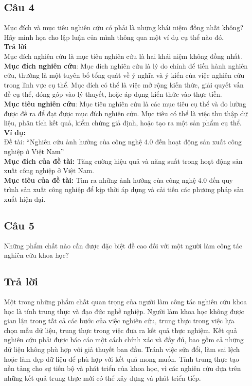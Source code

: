 \subsection*{Câu 4} Mục đích và mục tiêu nghiên cứu có phải là những khái niệm
đồng nhất không? Hãy minh họa cho lập luận của mình thông qua một ví
dụ cụ thể nào đó.\\
{\bf Trả lời}\\
Mục đích nghiên cứu là mục tiêu nghiên cứu là hai khái niệm không đồng nhất.\\
{\bf Mục đích nghiên cứu}: Mục đích nghiên cứu là lý do chính để tiến hành nghiên cứu, thường là một tuyên bố tổng quát về ý nghĩa và ý kiến của việc nghiên cứu trong lĩnh vực cụ thể. Mục đích có thể là việc mở rộng kiến thức, giải quyết vấn đề cụ thể, đóng góp vào lý thuyết, hoặc áp dụng kiến thức vào thực tiễn.\\
{\bf Mục tiêu nghiên cứu}: Mục tiêu nghiên cứu là các mục tiêu cụ thể và đo lường được đề ra để đạt được mục đích nghiên cứu. Mục tiêu có thể là việc thu thập dữ liệu, phân tích kết quả, kiểm chứng giả định, hoặc tạo ra một sản phẩm cụ thể.\\
{\bf Ví dụ:}\\
Đề tài: “Nghiên cứu ảnh hưởng của công nghệ 4.0 đến hoạt động sản xuất công nghiệp ở Việt Nam”\\
{\bf Mục đích của đề tài:} Tăng cường hiệu quả và năng suất trong hoạt động sản xuất công nghiệp ở Việt Nam.\\
{\bf Mục tiêu của đề tài:} Tìm ra những ảnh hưởng của công nghệ 4.0 đến quy trình sản xuất công nghiệp để kịp thời áp dụng và cải tiến các phương pháp sản xuất hiện đại.
\subsection*{Câu 5} Những phẩm chất nào cần được đặc biệt đề cao đối với một người làm công tác nghiên cứu khoa học?
\subsection*{Trả lời}
Một trong những phẩm chất quan trọng của người làm công tác nghiên cứu khoa học là tính trung thực và đạo đức nghề nghiệp.
Người làm khoa học không được gian lận trong tất cả các bước của việc nghiên cứu,
trung thực trong việc lựa chọn mẫu dữ liệu,
trung thực trong việc đưa ra kết quả thực nghiệm.
Kết quả nghiên cứu phải được báo cáo một cách chính xác và đầy đủ, bao gồm cả những dữ liệu không phù hợp với giả thuyết ban đầu.
Tránh việc sửa đổi, làm sai lệch hoặc làm đẹp dữ liệu để phù hợp với kết quả mong muốn. Tính trung thực tạo nền tảng cho sự tiến bộ và phát triển của khoa học, vì các nghiên cứu dựa trên những kết quả trung thực mới có thể xây dựng và phát triển tiếp.
